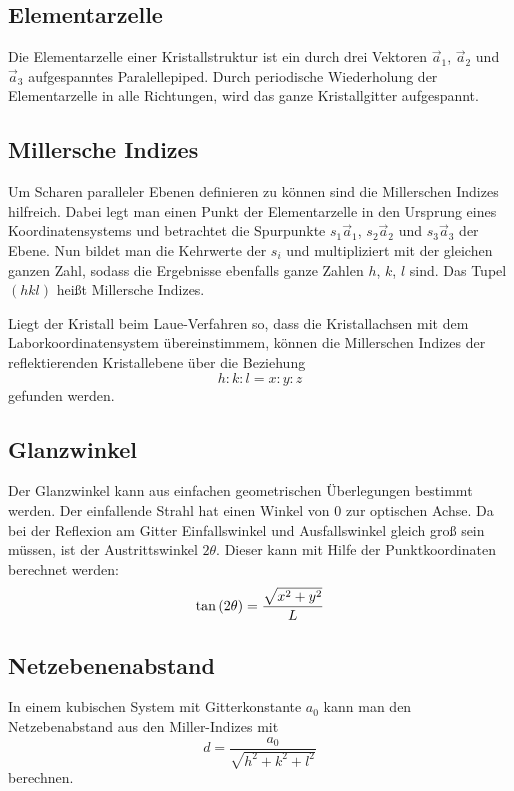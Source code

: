 \subsection{Elementarzelle}

Die Elementarzelle einer Kristallstruktur ist ein durch drei Vektoren
$\vec a_1$, $\vec a_2$ und $\vec a_3$ aufgespanntes Paralellepiped. Durch
periodische Wiederholung der Elementarzelle in alle Richtungen, wird das
ganze Kristallgitter aufgespannt.

\subsection{Millersche Indizes}

Um Scharen paralleler Ebenen definieren zu können sind die Millerschen
Indizes hilfreich. Dabei legt man einen Punkt der Elementarzelle in den
Ursprung eines Koordinatensystems und betrachtet die Spurpunkte $s_1\vec
a_1$, $s_2\vec a_2$ und $s_3\vec a_3$ der Ebene. Nun bildet man die
Kehrwerte der $s_i$ und multipliziert mit der gleichen ganzen Zahl, sodass die
Ergebnisse ebenfalls ganze Zahlen $h$, $k$, $l$ sind. Das Tupel $(hkl)$
heißt Millersche Indizes.

Liegt der Kristall beim Laue-Verfahren so, dass die Kristallachsen mit dem
Laborkoordinatensystem übereinstimmem, können die Millerschen Indizes der
reflektierenden Kristallebene über die Beziehung
\[
    h:k:l = x:y:z
\]
gefunden werden.

\subsection{Glanzwinkel}

Der Glanzwinkel kann aus einfachen geometrischen Überlegungen bestimmt
werden. Der einfallende Strahl hat einen Winkel von 0 zur optischen Achse. 
Da bei der Reflexion am Gitter Einfallswinkel und Ausfallswinkel gleich
groß sein müssen, ist der Austrittswinkel $2\theta$. Dieser kann mit Hilfe
der Punktkoordinaten berechnet werden:
\[
    \tan\del{2\theta} = \frac{\sqrt{x^2+y^2}}{L}
\]

\subsection{Netzebenenabstand}

In einem kubischen System mit Gitterkonstante $a_0$ kann man den
Netzebenabstand aus den Miller-Indizes mit
\[
    d = \frac {a_0} {\sqrt{ h^2 + k^2 + l^2}}
\]
berechnen. \parencite[Vorlesung~3]{physics613-Vorlesung}

